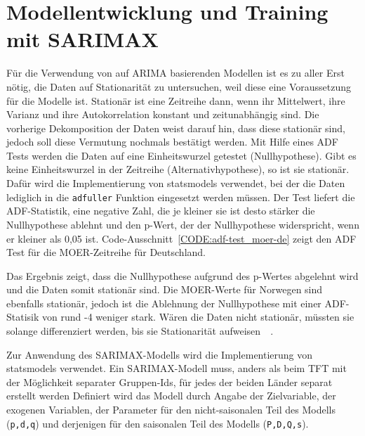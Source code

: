 \section{Modellentwicklung und Training mit SARIMAX}
Für die Verwendung von auf ARIMA basierenden Modellen ist es zu aller Erst nötig, die Daten auf Stationarität zu untersuchen, weil diese eine Voraussetzung für die Modelle ist.
Stationär ist eine Zeitreihe dann, wenn ihr Mittelwert, ihre Varianz und ihre Autokorrelation konstant und zeitunabhängig sind.
Die vorherige Dekomposition der Daten weist darauf hin, dass diese stationär sind, jedoch soll diese Vermutung nochmals bestätigt werden.
Mit Hilfe eines \ac{ADF} Tests werden die Daten auf eine Einheitswurzel getestet (Nullhypothese).
Gibt es keine Einheitswurzel in der Zeitreihe (Alternativhypothese), so ist sie stationär.
Dafür wird die Implementierung von statsmodels verwendet, bei der die Daten lediglich in die \lstinline[columns=fixed]{adfuller} Funktion eingesetzt werden müssen.
Der Test liefert die ADF-Statistik, eine negative Zahl, die je kleiner sie ist desto stärker die Nullhypothese ablehnt und den p-Wert, der der Nullhypothese widerspricht, wenn er kleiner als 0,05 ist.
Code-Ausschnitt~\ref{CODE:adf-test_moer-de} zeigt den \ac{ADF} Test für die \ac{MOER}-Zeitreihe für Deutschland.

Das Ergebnis zeigt, dass die Nullhypothese aufgrund des p-Wertes abgelehnt wird und die Daten somit stationär sind.
Die \ac{MOER}-Werte für Norwegen sind ebenfalls stationär, jedoch ist die Ablehnung der Nullhypothese mit einer ADF-Statisik von rund -4 weniger stark.
Wären die Daten nicht stationär, müssten sie solange differenziert werden, bis sie Stationarität aufweisen~\cite{Peixeiro.2022}~\cite{Rahmadhan.8.5.2023}.

Zur Anwendung des SARIMAX-Modells wird die Implementierung von \glqq statsmodels\grqq{} verwendet.
Ein SARIMAX-Modell muss, anders als beim \ac{TFT} mit der Möglichkeit separater Gruppen-Ids, für jedes der beiden Länder separat erstellt werden
Definiert wird das Modell durch Angabe der Zielvariable, der exogenen Variablen, der Parameter für den nicht-saisonalen Teil des Modells (\lstinline[columns=fixed]{p,d,q}) und derjenigen für den saisonalen Teil des Modells (\lstinline[columns=fixed]{P,D,Q,s}).

